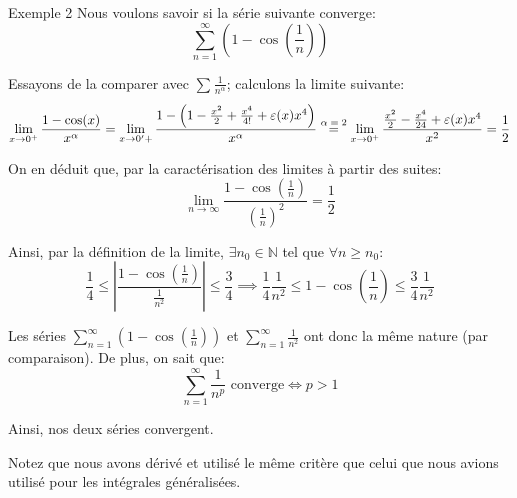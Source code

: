 \documentclass[a4paper]{article}
\begin{document}
\begin{parag}{Exemple 2}
    Nous voulons savoir si la série suivante converge: 
    \[\sum_{n=1}^{\infty} \left(1 - \cos\left(\frac{1}{n}\right)\right)\]
    
    Essayons de la comparer avec $\sum_{}^{} \frac{1}{n^{\alpha}}$; calculons la limite suivante: 
    \[\lim_{x \to 0^+} \frac{1 - \cos\left(x\right)}{x^{\alpha}} = \lim_{x \to 0'+} \frac{1 - \left(1 - \frac{x^2}{2} + \frac{x^4}{4!} + \epsilon\left(x\right)x^4\right)}{x^{\alpha}} \over{=}{$\alpha = 2$} \lim_{x \to 0^+} \frac{\frac{x^2}{2} - \frac{x^4}{24} + \epsilon\left(x\right)x^4}{x^2} = \frac{1}{2}\]
    
    On en déduit que, par la caractérisation des limites à partir des suites: 
    \[\lim_{n \to \infty} \frac{1 - \cos\left(\frac{1}{n}\right)}{\left(\frac{1}{n}\right)^2} = \frac{1}{2}\]
    
    Ainsi, par la définition de la limite, $\exists n_0 \in\mathbb{N}$ tel que $\forall n \geq n_0$: 
    \[\frac{1}{4} \leq \left|\frac{1 - \cos\left(\frac{1}{n}\right)}{\frac{1}{n^2}}\right| \leq \frac{3}{4} \implies \frac{1}{4} \frac{1}{n^2} \leq 1 - \cos\left(\frac{1}{n}\right) \leq \frac{3}{4} \frac{1}{n^2}\]
    
    Les séries $\sum_{n=1}^{\infty} \left(1 - \cos\left(\frac{1}{n}\right)\right)$ et $\sum_{n = 1}^{\infty} \frac{1}{n^2}$ ont donc la même nature (par comparaison). De plus, on sait que: 
    \[\sum_{n=1}^{\infty} \frac{1}{n^p} \text{ converge} \iff p > 1\]

    Ainsi, nos deux séries convergent.

    Notez que nous avons dérivé et utilisé le même critère que celui que nous avions utilisé pour les intégrales généralisées.
\end{parag}
\end{document}
